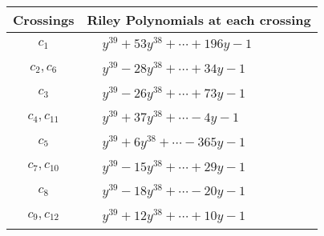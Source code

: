 \documentclass[1p]{elsarticle_modified}
\theoremstyle{definition}
\begin{document}
\begin{tabular}{m{50pt}|m{274pt}}
Crossings & \hspace{64pt}Riley Polynomials at each crossing \\
\hline $$\begin{aligned}c_{1}\end{aligned}$$&$\begin{aligned}
&y^{39}+53 y^{38}+\cdots+196 y-1
\end{aligned}$\\
\hline $$\begin{aligned}c_{2},c_{6}\end{aligned}$$&$\begin{aligned}
&y^{39}-28 y^{38}+\cdots+34 y-1
\end{aligned}$\\
\hline $$\begin{aligned}c_{3}\end{aligned}$$&$\begin{aligned}
&y^{39}-26 y^{38}+\cdots+73 y-1
\end{aligned}$\\
\hline $$\begin{aligned}c_{4},c_{11}\end{aligned}$$&$\begin{aligned}
&y^{39}+37 y^{38}+\cdots-4 y-1
\end{aligned}$\\
\hline $$\begin{aligned}c_{5}\end{aligned}$$&$\begin{aligned}
&y^{39}+6 y^{38}+\cdots-365 y-1
\end{aligned}$\\
\hline $$\begin{aligned}c_{7},c_{10}\end{aligned}$$&$\begin{aligned}
&y^{39}-15 y^{38}+\cdots+29 y-1
\end{aligned}$\\
\hline $$\begin{aligned}c_{8}\end{aligned}$$&$\begin{aligned}
&y^{39}-18 y^{38}+\cdots-20 y-1
\end{aligned}$\\
\hline $$\begin{aligned}c_{9},c_{12}\end{aligned}$$&$\begin{aligned}
&y^{39}+12 y^{38}+\cdots+10 y-1
\end{aligned}$\\
\hline
\end{tabular}\\~\\
\end{document}
